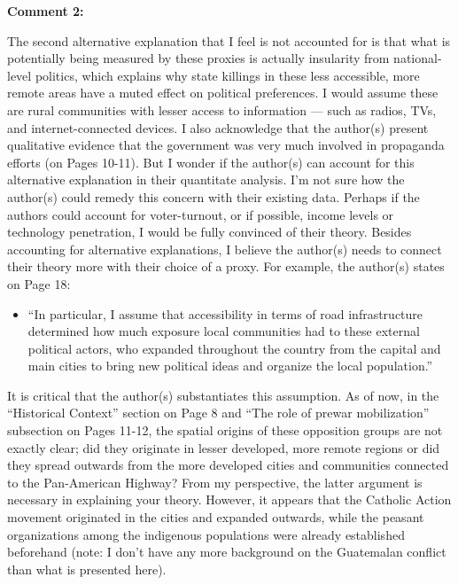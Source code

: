 \documentclass[12pt, a4paper, notitlepage]{article}
\begin{document}
\vspace{15pt}
\noindent\textbf{Comment 2:}
\begin{displayquote}
The second alternative explanation that I feel is not accounted for is that what is potentially being measured by these proxies is actually insularity from national- level politics, which explains why state killings in these less accessible, more remote areas have a muted effect on political preferences. I would assume these are rural communities with lesser access to information — such as radios, TVs, and internet-connected devices. I also acknowledge that the author(s) present qualitative evidence that the government was very much involved in propaganda efforts (on Pages 10-11). But I wonder if the author(s) can account for this alternative explanation in their quantitate analysis. I’m not sure how the author(s) could remedy this concern with their existing data. Perhaps if the authors could account for voter-turnout, or if possible, income levels or technology penetration, I would be fully convinced of their theory.
Besides accounting for alternative explanations, I believe the author(s) needs to connect their theory more with their choice of a proxy. For example, the author(s) states on Page 18:
\begin{itemize}
  \item[] ``In particular, I assume that accessibility in terms of road infrastructure determined how much exposure local communities had to these external political actors, who expanded throughout the country from the capital and main cities to bring new political ideas and organize the local population.''
\end{itemize}
It is critical that the author(s) substantiates this assumption. As of now, in the “Historical Context” section on Page 8 and “The role of prewar mobilization” subsection on Pages 11-12, the spatial origins of these opposition groups are not exactly clear; did they originate in lesser developed, more remote regions or did they spread outwards from the more developed cities and communities connected to the Pan-American Highway? From my perspective, the latter argument is necessary in explaining your theory. However, it appears that the Catholic Action movement originated in the cities and expanded outwards, while the peasant organizations among the indigenous populations were already established beforehand (note: I don’t have any more background on the Guatemalan conflict than what is presented here).
\end{displayquote}
\end{document}
